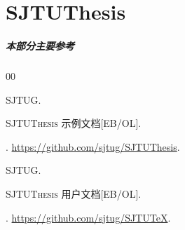 
\part{SJTUThesis}

\begin{frame}

  \frametitle{本部分主要参考}

  \begin{bibliolist}{00}

    \onlineitem \textsc{SJTUG}.

    \newblock \textsc{SJTUThesis} 示例文档[EB/OL].

    . \url{https://github.com/sjtug/SJTUThesis}.

    \onlineitem \textsc{SJTUG}.

    \newblock \textsc{SJTUThesis} 用户文档[EB/OL].

    . \url{https://github.com/sjtug/SJTUTeX}.

  \end{bibliolist}

\end{frame}

